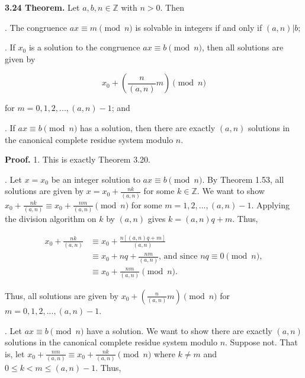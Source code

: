 \documentclass[12pt]{article}
\begin{document}
\noindent\textbf{3.24 Theorem.} Let $a,b,n\in\mathbb{Z}$ with $n>0$. Then

\bigskip

. The congruence $ax\equiv m\pmod n$ is solvable in integers if and only if $(a,n)|b$;

\bigskip

. If $x_0$ is a solution to the congruence $ax\equiv b\pmod n$, then all solutions are given by 

\begin{equation*}
x_0+\left(\frac{n}{(a,n)}m\right)\pmod n
\end{equation*}

\noindent for $m=0,1,2,...,(a,n)-1$; and

\bigskip

. If $ax\equiv b\pmod n$ has a solution, then there are exactly $(a,n)$ solutions in the canonical complete residue system modulo $n$.

\bigskip

\noindent\textbf{Proof.} 1. This is exactly Theorem 3.20.

\bigskip

. Let $x=x_0$ be an integer solution to $ax\equiv b\pmod n$. By Theorem 1.53, all solutions are given by $x=x_0+\frac{nk}{(a,n)}$ for some $k\in\mathbb{Z}$. We want to show $x_0+\frac{nk}{(a,n)}\equiv x_0+\frac{nm}{(a,n)} \pmod n$ for some $m=1,2,...,(a,n)-1$. Applying the division algorithm on $k$ by $(a,n)$ gives $k=(a,n)q+m$. Thus,

\begin{align*}
x_0+\frac{nk}{(a,n)} &\equiv x_0+\frac{n[(a,n)q+m]}{(a,n)}\\
&\equiv x_0 + nq + \frac{nm}{(a,n)} \text{, and since } nq\equiv 0\pmod n, \\
&\equiv x_0 + \frac{nm}{(a,n)}\pmod n.
\end{align*}

\noindent Thus, all solutions are given by $x_0+\left(\frac{n}{(a,n)}m\right)\pmod n$ for \\
$m=0,1,2,...,(a,n)-1$.

\bigskip

. Let $ax\equiv b\pmod n$ have a solution. We want to show there are exactly $(a,n)$ solutions in the canonical complete residue system modulo $n$. Suppose not. That is, let $x_0+\frac{nm}{(a,n)}\equiv x_0+\frac{nk}{(a,n)} \pmod n$ where $k\not= m$ and\\
 $0\leq k < m \leq (a,n)-1$. Thus,
\end{document}
